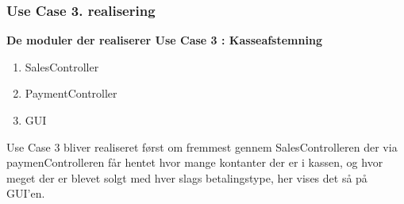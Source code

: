 \subsubsection{ Use Case 3. realisering}
\textbf{De moduler der realiserer Use Case 3 : Kasseafstemning}

\begin{enumerate}
	\item SalesController
	\item PaymentController
	\item GUI
\end{enumerate}

Use Case 3 bliver realiseret først om fremmest gennem SalesControlleren der via paymenControlleren får hentet hvor mange kontanter der er i kassen, og hvor meget der er blevet solgt med hver slags betalingstype, her vises det så på GUI'en. 